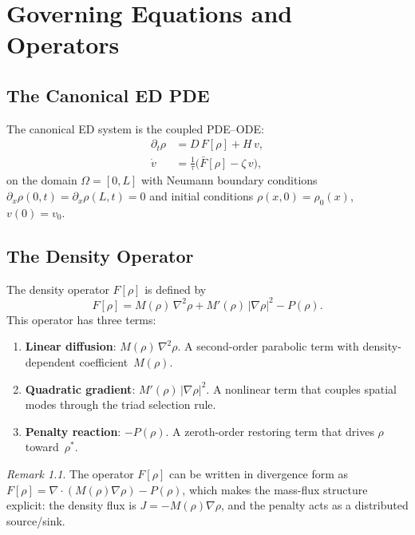\documentclass[11pt,twoside,openright]{book}
\theoremstyle{definition}
\theoremstyle{plain}
\theoremstyle{definition}
\theoremstyle{remark}
\newtheorem{remark}{Remark}[chapter]
\newcommand{\rhostar}{\rho^{*}}
\newcommand{\Fop}{F[\rho]}
\newcommand{\Fbar}{\bar{F}[\rho]}
\begin{document}
\chapter{Governing Equations and Operators}\label{ch:equations}

\section{The Canonical ED PDE}\label{sec:canonical-pde}

The canonical ED system is the coupled PDE--ODE:
\begin{subequations}\label{eq:canonical}
\begin{align}
\partial_t\rho &= D\,\Fop + H\,v, \label{eq:canonical-a}\\
\dot{v} &= \frac{1}{\tau}\bigl(\Fbar - \zeta\,v\bigr), \label{eq:canonical-b}
\end{align}
\end{subequations}
on the domain \(\Omega = [0,L]\) with Neumann boundary conditions \(\partial_x\rho(0,t) = \partial_x\rho(L,t) = 0\) and initial conditions \(\rho(x,0) = \rho_0(x)\), \(v(0) = v_0\).

\section{The Density Operator}\label{sec:operator}

The density operator \(\Fop\) is defined by
\begin{equation}\label{eq:operator}
\Fop = M(\rho)\,\nabla^2\rho + M'(\rho)\,|\nabla\rho|^2 - P(\rho).
\end{equation}
This operator has three terms:
\begin{enumerate}
\item \textbf{Linear diffusion}: \(M(\rho)\,\nabla^2\rho\). A second-order parabolic term with density-dependent coefficient~\(M(\rho)\).
\item \textbf{Quadratic gradient}: \(M'(\rho)\,|\nabla\rho|^2\). A nonlinear term that couples spatial modes through the triad selection rule.
\item \textbf{Penalty reaction}: \(-P(\rho)\). A zeroth-order restoring term that drives \(\rho\) toward~\(\rhostar\).
\end{enumerate}

\begin{remark}\label{rem:divergence}
The operator \(\Fop\) can be written in divergence form as \(\Fop = \nabla \cdot (M(\rho)\nabla\rho) - P(\rho)\), which makes the mass-flux structure explicit: the density flux is \(J = -M(\rho)\nabla\rho\), and the penalty acts as a distributed source/sink.
\end{remark}
\end{document}
